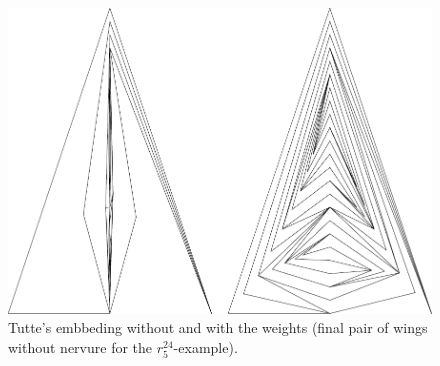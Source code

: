 \begin{figure}[!htb]
\begin{center}
\includegraphics[width=13cm]{A.figs/controlmapsnovo6.pdf}
\caption{Tutte's embbeding without and with the weights (final pair of 
wings without nervure for the $r_5^{24}$-example).}
\label{fig:controlmapsnovo6}
\end{center}
\end{figure}

